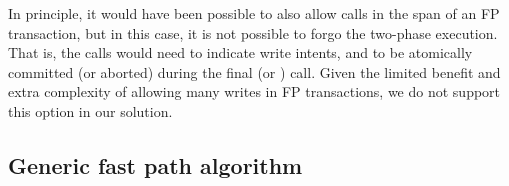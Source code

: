 {In principle, it would have been possible to also allow  calls in the span of an FP transaction, 
but in this case, it is not possible to forgo the two-phase execution. 
That is, the  calls would need to indicate write intents, and  to be atomically committed (or aborted) during the final  
(or ) call. 
Given the limited benefit and extra complexity of allowing many writes in FP transactions, we do not support this option in our solution.

}


\subsection{Generic fast path algorithm}
\label{ssec:fast-algorithm}



